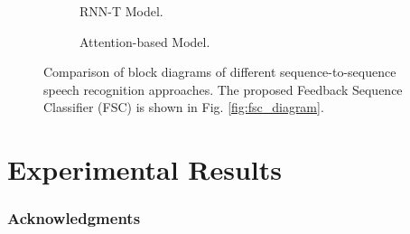 \documentclass{article}
\begin{document}
\begin{figure}
  \centering
  \begin{subfigure}[b]{0.60\textwidth}
    \centering
    \resizebox{78mm}{!}{
      
    }
    \caption {
      RNN-T Model.
      \label{fig:rnn_t_diagram}
    }
  \end{subfigure}

  \begin{subfigure}[b]{0.55\textwidth}
    \centering
    \resizebox{53mm}{!}{
      
    }
    \caption {
      Attention-based Model.
      \label{fig:attention_diagram}
    }
  \end{subfigure}
  \caption{
    Comparison of block diagrams of different sequence-to-sequence speech
    recognition approaches.
    The proposed Feedback Sequence Classifier (FSC) is shown in 
    Fig. \ref{fig:fsc_diagram}.
  }

\end{figure}




\section{Experimental Results}
\label{sec:experimental_results}


\subsubsection*{Acknowledgments}



\small

\clearpage
\newpage


\end{document}
